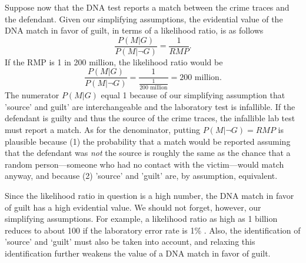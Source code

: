\documentclass[10pt]{article}
\begin{document}
Suppose now that the DNA test reports a match between the crime 
traces and the defendant.  Given our simplifying assumptions, 
the evidential value of the DNA match in favor of guilt, in terms of a likelihood ratio, 
is as follows %
%
\[
\frac{P(M | G)}{P(M | \neg G)} =   \frac{1}{RMP}.
\]
%
If the RMP is 1 in 200 million, the likelihood ratio would be
%
\[\frac{P(M |G)}{P( M | \neg G)}=\frac{1}{\frac{1}{\text{200 million}}}=\text{200 million}.\]
%
The numerator $P(M | G)$ equal 1 because of our simplifying assumption that 'source' and guilt' are interchangeable 
and the laboratory test is infallible. If the defendant is guilty and thus the source of the crime traces, the infallible 
lab test must report a match. As for the denominator, 
putting $P(M | \neg G)=RMP$ is plausible because (1) the probability that a match would be reported assuming that the defendant was \textit{not} 
the source is roughly the same as the chance that a random person---someone who had no contact with the victim---would match anyway, 
and because (2) 'source' and 'guilt' are, by assumption, equivalent.



Since the likelihood ratio in question is a high number, the DNA match in favor of guilt 
has a high evidential value. We should not forget, however, 
our simplifying assumptions. For example, a likelihood ratio as high as 
1 billion reduces to about 100 if the laboratory error rate is 1\% \citep{Thomason2003How-the-Probabi}.
Also, the identification of 'source' and 
`guilt' must also be taken into account, and relaxing this identification 
further weakens the value of a DNA match in favor of guilt.
\end{document}
